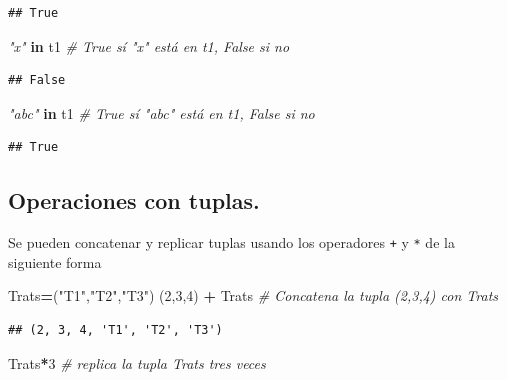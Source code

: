 \documentclass[
]{book}
\newenvironment{Shaded}{\begin{snugshade}}{\end{snugshade}}
\newcommand{\CommentTok}[1]{\textcolor[rgb]{0.56,0.35,0.01}{\textit{#1}}}
\newcommand{\DecValTok}[1]{\textcolor[rgb]{0.00,0.00,0.81}{#1}}
\newcommand{\KeywordTok}[1]{\textcolor[rgb]{0.13,0.29,0.53}{\textbf{#1}}}
\newcommand{\NormalTok}[1]{#1}
\newcommand{\OperatorTok}[1]{\textcolor[rgb]{0.81,0.36,0.00}{\textbf{#1}}}
\newcommand{\StringTok}[1]{\textcolor[rgb]{0.31,0.60,0.02}{#1}}
\theoremstyle{definition}
\theoremstyle{definition}
\theoremstyle{definition}
\theoremstyle{definition}
\theoremstyle{remark}
\begin{document}
\begin{verbatim}
## True
\end{verbatim}

\begin{Shaded}
\begin{Highlighting}[]
\CommentTok{"x"} \KeywordTok{in}\NormalTok{ t1   }\CommentTok{\# True sí  "x" está en t1,  False si no }
\end{Highlighting}
\end{Shaded}

\begin{verbatim}
## False
\end{verbatim}

\begin{Shaded}
\begin{Highlighting}[]
\CommentTok{"abc"} \KeywordTok{in}\NormalTok{ t1 }\CommentTok{\# True sí "abc" está en t1,  False si no }
\end{Highlighting}
\end{Shaded}

\begin{verbatim}
## True
\end{verbatim}

\hypertarget{operaciones-con-tuplas.}{%
\subsection{Operaciones con tuplas.}\label{operaciones-con-tuplas.}}

Se pueden concatenar y replicar tuplas usando los operadores \texttt{+} y \texttt{*} de la siguiente forma

\begin{Shaded}
\begin{Highlighting}[]
\NormalTok{Trats}\OperatorTok{=}\NormalTok{(}\StringTok{"T1"}\NormalTok{,}\StringTok{"T2"}\NormalTok{,}\StringTok{"T3"}\NormalTok{) }
\NormalTok{(}\DecValTok{2}\NormalTok{,}\DecValTok{3}\NormalTok{,}\DecValTok{4}\NormalTok{) }\OperatorTok{+}\NormalTok{ Trats }\CommentTok{\# Concatena la tupla (2,3,4) con Trats }
\end{Highlighting}
\end{Shaded}

\begin{verbatim}
## (2, 3, 4, 'T1', 'T2', 'T3')
\end{verbatim}

\begin{Shaded}
\begin{Highlighting}[]
\NormalTok{Trats}\OperatorTok{*}\DecValTok{3}         \CommentTok{\# replica la tupla Trats tres veces }
\end{Highlighting}
\end{Shaded}
\end{document}
